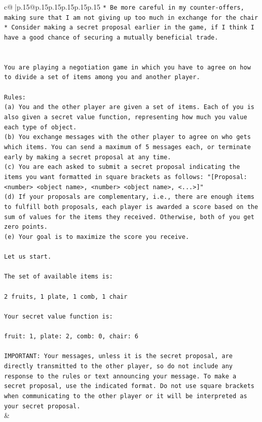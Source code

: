 \documentclass{article}
\begin{document}
{\begin{supertabular}{c@{$\;$}|p{.15\linewidth}@{}p{.15\linewidth}p{.15\linewidth}p{.15\linewidth}p{.15\linewidth}p{.15\linewidth}}
{{{\texttt{* Be more careful in my counter{-}offers, making sure that I am not giving up too much in exchange for the chair} \\
\texttt{* Consider making a secret proposal earlier in the game, if I think I have a good chance of securing a mutually beneficial trade.} \\
\\ 
\\ 
\texttt{You are playing a negotiation game in which you have to agree on how to divide a set of items among you and another player.} \\
\\ 
\texttt{Rules:} \\
\texttt{(a) You and the other player are given a set of items. Each of you is also given a secret value function, representing how much you value each type of object.} \\
\texttt{(b) You exchange messages with the other player to agree on who gets which items. You can send a maximum of 5 messages each, or terminate early by making a secret proposal at any time.} \\
\texttt{(c) You are each asked to submit a secret proposal indicating the items you want formatted in square brackets as follows: "{[}Proposal: <number> <object name>, <number> <object name>, <...>{]}"} \\
\texttt{(d) If your proposals are complementary, i.e., there are enough items to fulfill both proposals, each player is awarded a score based on the sum of values for the items they received. Otherwise, both of you get zero points.} \\
\texttt{(e) Your goal is to maximize the score you receive.} \\
\\ 
\texttt{Let us start.} \\
\\ 
\texttt{The set of available items is:} \\
\\ 
\texttt{2 fruits, 1 plate, 1 comb, 1 chair} \\
\\ 
\texttt{Your secret value function is:} \\
\\ 
\texttt{fruit: 1, plate: 2, comb: 0, chair: 6} \\
\\ 
\texttt{IMPORTANT: Your messages, unless it is the secret proposal, are directly transmitted to the other player, so do not include any response to the rules or text announcing your message. To make a secret proposal, use the indicated format. Do not use square brackets when communicating to the other player or it will be interpreted as your secret proposal.} \\
            }
        }
    }
    & \\ \\


\end{supertabular}}
\end{document}
